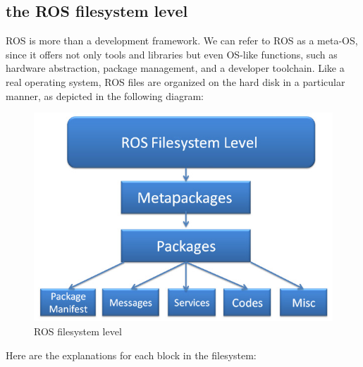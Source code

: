 \documentclass[../../main]{subfiles}
\begin{document}
\subsection{the ROS filesystem level}
ROS is more than a development framework. We can refer to ROS as a meta-OS, since
it offers not only tools and libraries but even OS-like functions, such as hardware
abstraction, package management, and a developer toolchain. Like a real operating
system, ROS files are organized on the hard disk in a particular manner, as depicted in the
following diagram:
\begin{figure}[ht]
    \centering
    \includegraphics{img/filesystem.jpg}
    \caption{ROS filesystem level}
\end{figure}
Here are the explanations for each block in the filesystem:
\end{document}
